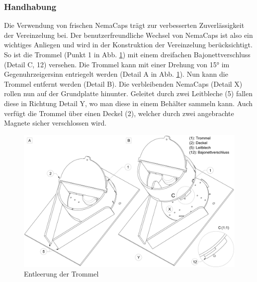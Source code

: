 \subsubsection{Handhabung}
Die Verwendung von frischen NemaCaps trägt zur verbesserten Zuverlässigkeit der Vereinzelung bei. Der benutzerfreundliche Wechsel von NemaCaps ist also ein wichtiges Anliegen und wird in der Konstruktion der Vereinzelung berücksichtigt. So ist die Trommel (Punkt 1 in Abb. \ref{fig:vereinzelung_entleeren}) mit einem dreifachen Bajonettverschluss (Detail C, 12) versehen. Die Trommel kann mit einer Drehung von 15° im Gegenuhrzeigersinn entriegelt werden (Detail A in Abb. \ref{fig:vereinzelung_entleeren}). Nun kann die Trommel entfernt werden (Detail B). Die verbleibenden NemaCaps (Detail X) rollen nun auf der Grundplatte hinunter. Geleitet durch zwei Leitbleche (5) fallen diese in Richtung Detail Y, wo man diese in einem Behälter sammeln kann. Auch verfügt die Trommel über einen Deckel (2), welcher durch zwei angebrachte Magnete sicher verschlossen wird.
	\begin{figure}[H]
	\includegraphics[scale=0.42]{Illustrationen/6-Umsetzung/vereinzelung_entleeren.jpg}
	\caption{Entleerung der Trommel}
	\label{fig:vereinzelung_entleeren}
	\end{figure}
